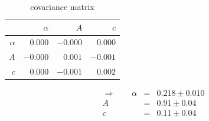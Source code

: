 \begin{table}
    \centering
    \caption{covariance matrix}
 \begin{tabular}{|r|r|r|r|}
 \hline 
\cellcolor[RGB]{204,204,255}&\cellcolor[RGB]{204,204,255}$\alpha$&\cellcolor[RGB]{204,204,240}$A$&\cellcolor[RGB]{204,204,225}$c$\\ \hline 
 \cellcolor[RGB]{204,204,255}$\alpha$&$0.000$ &$-0.000$ &$0.000$ \\ \hline
\cellcolor[RGB]{204,204,240}$A$&$-0.000$ &$0.001$ &$-0.001$ \\ \hline
\cellcolor[RGB]{204,204,225}$c$&$0.000$ &$-0.001$ &$0.002$ \\ \hline
\end{tabular}
\begin{align}
    \Rightarrow \qquad
    \alpha &=& 0.218 \pm 0.010 \\
    A &=& 0.91 \pm 0.04 \\
    c &=& 0.11 \pm 0.04 
\end{align}
\end{table}
